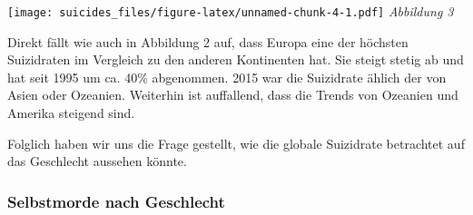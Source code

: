 \documentclass[]{article}
\newenvironment{Shaded}{\begin{snugshade}}{\end{snugshade}}
\newcommand{\DataTypeTok}[1]{\textcolor[rgb]{0.13,0.29,0.53}{#1}}
\newcommand{\DecValTok}[1]{\textcolor[rgb]{0.00,0.00,0.81}{#1}}
\newcommand{\KeywordTok}[1]{\textcolor[rgb]{0.13,0.29,0.53}{\textbf{#1}}}
\newcommand{\NormalTok}[1]{#1}
\newcommand{\OperatorTok}[1]{\textcolor[rgb]{0.81,0.36,0.00}{\textbf{#1}}}
\newcommand{\StringTok}[1]{\textcolor[rgb]{0.31,0.60,0.02}{#1}}
\begin{document}
\texttt{[image: suicides\_files/figure-latex/unnamed-chunk-4-1.pdf]}
\emph{Abbildung 3}

Direkt fällt wie auch in Abbildung 2 auf, dass Europa eine der höchsten
Suizidraten im Vergleich zu den anderen Kontinenten hat. Sie steigt
stetig ab und hat seit 1995 um ca. 40\% abgenommen. 2015 war die
Suizidrate ählich der von Asien oder Ozeanien. Weiterhin ist auffallend,
dass die Trends von Ozeanien und Amerika steigend sind.

Folglich haben wir uns die Frage gestellt, wie die globale Suizidrate
betrachtet auf das Geschlecht aussehen könnte.

\hypertarget{selbstmorde-nach-geschlecht}{%
\subsubsection{Selbstmorde nach
Geschlecht}\label{selbstmorde-nach-geschlecht}}

\begin{Shaded}
\end{Shaded}
\end{document}
